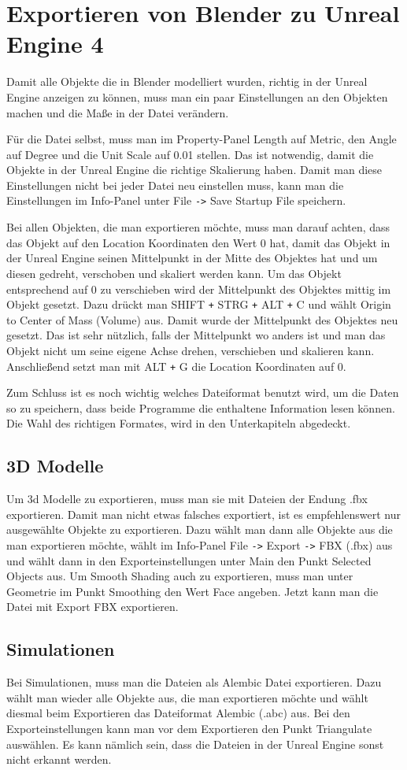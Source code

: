 \section{Exportieren von Blender zu Unreal Engine 4}
\label{Exportieren_von_Blender_zu_Unreal_Engine_4:ref1}
Damit alle Objekte die in Blender modelliert wurden, richtig in der Unreal Engine anzeigen zu können, muss man ein paar
Einstellungen an den Objekten machen und die Maße in der Datei verändern.

Für die Datei selbst, muss man im Property-Panel Length auf Metric, den Angle auf Degree und die Unit Scale auf 0.01 stellen.
Das ist notwendig, damit die Objekte in der Unreal Engine die richtige Skalierung haben. Damit man diese Einstellungen nicht bei
jeder Datei neu einstellen muss, kann man die Einstellungen im Info-Panel unter File \verb+->+ Save Startup File speichern.

Bei allen Objekten, die man exportieren möchte, muss man darauf achten, dass das Objekt auf den Location Koordinaten
den Wert 0 hat, damit das Objekt in der Unreal Engine seinen Mittelpunkt in der Mitte des Objektes hat und um diesen gedreht, verschoben und skaliert werden kann.
Um das Objekt entsprechend auf 0 zu verschieben wird der Mittelpunkt des Objektes mittig im Objekt gesetzt. Dazu drückt man SHIFT \verb-+- STRG \verb-+- ALT \verb-+- C und
wählt Origin to Center of Mass (Volume) aus. Damit wurde der Mittelpunkt des Objektes neu gesetzt. Das ist sehr nützlich, falls der Mittelpunkt wo anders ist und man das
Objekt nicht um seine eigene Achse drehen, verschieben und skalieren kann. Anschließend setzt man mit ALT \verb-+- G die Location Koordinaten auf 0.

Zum Schluss ist es noch wichtig welches Dateiformat benutzt wird, um die Daten so zu speichern, dass beide Programme die enthaltene
Information lesen können. Die Wahl des richtigen Formates, wird in den Unterkapiteln abgedeckt.

\subsection{3D Modelle}
Um 3d Modelle zu exportieren, muss man sie mit Dateien der Endung .fbx exportieren. Damit man nicht etwas falsches exportiert, ist es empfehlenswert
nur ausgewählte Objekte zu exportieren. Dazu wählt man dann alle Objekte aus die man exportieren möchte, wählt im Info-Panel File \verb+->+
Export \verb+->+ FBX (.fbx) aus und wählt dann in den Exporteinstellungen unter Main den Punkt Selected Objects aus. Um Smooth Shading auch zu exportieren,
muss man unter Geometrie im Punkt Smoothing den Wert Face angeben. Jetzt kann man die Datei mit Export FBX exportieren.

\subsection{Simulationen}
Bei Simulationen, muss man die Dateien als Alembic Datei exportieren. Dazu wählt man wieder alle Objekte aus, die man exportieren möchte und
wählt diesmal beim Exportieren das Dateiformat Alembic (.abc) aus. Bei den Exporteinstellungen kann man vor dem Exportieren den Punkt Triangulate auswählen.
Es kann nämlich sein, dass die Dateien in der Unreal Engine sonst nicht erkannt werden.